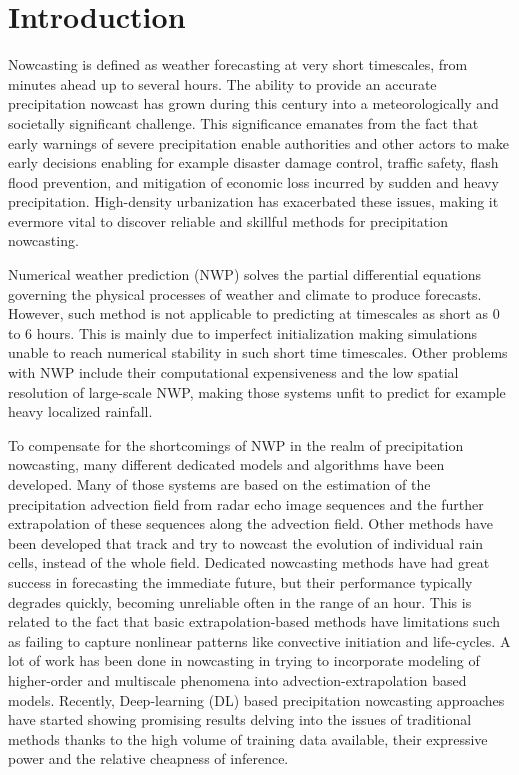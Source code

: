 \chapter{Introduction}
\label{chapter:intro}



Nowcasting is defined as weather forecasting at very short timescales, from minutes ahead up to several hours. The ability to provide an accurate precipitation nowcast has grown during this century into a meteorologically and societally significant challenge. This significance emanates from the fact that early warnings of severe precipitation enable authorities and other actors to make early decisions enabling for example disaster damage control, traffic safety, flash flood prevention, and mitigation of economic loss incurred by sudden and heavy precipitation. High-density urbanization has exacerbated these issues, making it evermore vital to discover reliable and skillful methods for precipitation nowcasting. 

Numerical weather prediction (NWP) solves the partial differential equations governing the physical processes of weather and climate to produce forecasts. However, such method is not applicable to predicting at timescales as short as 0 to 6 hours. This is mainly due to imperfect initialization making simulations unable to reach numerical stability in such short time timescales. Other problems with NWP include their computational expensiveness and the low spatial resolution of large-scale NWP, making those systems unfit to predict for example heavy localized rainfall. 


To compensate for the shortcomings of NWP in the realm of precipitation nowcasting, many different dedicated models and algorithms have been developed. Many of those systems are based on the estimation of the precipitation advection field from radar echo image sequences and the further extrapolation of these sequences along the advection field. Other methods have been developed that track and try to nowcast the evolution of individual rain cells, instead of the whole field. Dedicated nowcasting methods have had great success in forecasting the immediate future, but their performance typically degrades quickly, becoming unreliable often in the range of an hour. This is related to the fact that basic extrapolation-based methods have limitations such as failing to capture nonlinear patterns like convective initiation and life-cycles. A lot of work has been done in nowcasting in trying to incorporate modeling of higher-order and multiscale phenomena into advection-extrapolation based models. Recently, Deep-learning (DL) based precipitation nowcasting approaches have started showing promising results delving into the issues of traditional methods thanks to the high volume of training data available, their expressive power and the relative cheapness of inference. 


